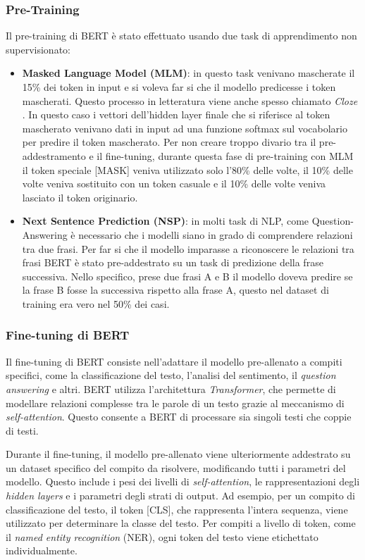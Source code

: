 \documentclass[../../Thesis.tex]{subfiles}
\begin{document}
\subsubsection{Pre-Training}
Il pre-training di BERT \`e stato effettuato usando due task di apprendimento non supervisionato: 
\begin{itemize}
    \item \textbf{Masked Language Model (MLM)}: in questo task venivano mascherate il 15\% dei token in input e si voleva far si che il modello predicesse i token mascherati. Questo processo in letteratura viene anche spesso chiamato \emph{Cloze} \cite{Taylor1953}. In questo caso i vettori dell'hidden layer finale che si riferisce al token mascherato venivano dati in input ad una funzione softmax sul vocabolario per predire il token mascherato. Per non creare troppo divario tra il pre-addestramento e il fine-tuning, durante questa fase di pre-training con MLM il token speciale [MASK] veniva utilizzato solo l'80\% delle volte, il 10\% delle volte veniva sostituito con un token casuale e il 10\% delle volte veniva lasciato il token originario.
    \item \textbf{Next Sentence Prediction (NSP)}: in molti task di NLP, come Question-Answering \`e necessario che i modelli siano in grado di comprendere relazioni tra due frasi. Per far si che il modello imparasse a riconoscere le relazioni tra frasi BERT \`e stato pre-addestrato su un task di predizione della frase successiva. Nello specifico, prese due frasi A e B il modello doveva predire se la frase B fosse la successiva rispetto alla frase A, questo nel dataset di training era vero nel 50\% dei casi. 
\end{itemize}

\subsubsection{Fine-tuning di BERT}

Il fine-tuning di BERT consiste nell'adattare il modello pre-allenato a compiti specifici, come la classificazione del testo, l'analisi del sentimento, il \textit{question answering} e altri. BERT utilizza l'architettura \textit{Transformer}, che permette di modellare relazioni complesse tra le parole di un testo grazie al meccanismo di \textit{self-attention}. Questo consente a BERT di processare sia singoli testi che coppie di testi.

Durante il fine-tuning, il modello pre-allenato viene ulteriormente addestrato su un dataset specifico del compito da risolvere, modificando tutti i parametri del modello. Questo include i pesi dei livelli di \textit{self-attention}, le rappresentazioni degli \textit{hidden layers} e i parametri degli strati di output. Ad esempio, per un compito di classificazione del testo, il token [CLS], che rappresenta l'intera sequenza, viene utilizzato per determinare la classe del testo. Per compiti a livello di token, come il \textit{named entity recognition} (NER), ogni token del testo viene etichettato individualmente.
\end{document}
